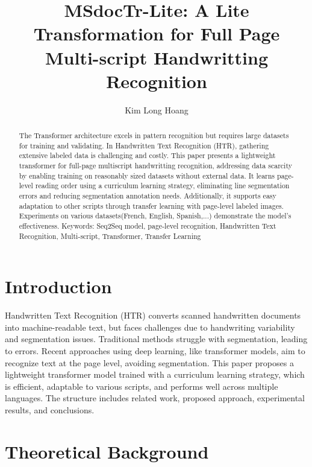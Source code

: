 \documentclass{article}
\title{MSdocTr-Lite: A Lite Transformation for Full Page Multi-script Handwritting Recognition}
\author{Kim Long Hoang}
\begin{document}
\maketitle

\begin{abstract}
 The Transformer architecture excels in pattern recognition but requires large datasets for training and validating. In Handwritten Text Recognition (HTR), gathering extensive labeled data is challenging and costly. This paper presents a lightweight transformer for full-page multiscript handwritting recognition, addressing data scarcity by enabling training on reasonably sized datasets without external data. It learns page-level reading order using a curriculum learning strategy, eliminating line segmentation errors and reducing segmentation annotation needs. Additionally, it supports easy adaptation to other scripts through transfer learning with page-level labeled images. Experiments on various datasets(French, English, Spanish,...) demonstrate the model's effectiveness. 
Keywords: Seq2Seq model, page-level recognition, Handwritten Text Recognition, Multi-script, Transformer, Transfer Learning  
\end{abstract}

\newpage
\tableofcontents
\listoffigures
\listoftables

\newpage
\section{Introduction}

Handwritten Text Recognition (HTR) converts scanned handwritten documents into machine-readable text, but faces challenges due to handwriting variability and segmentation issues. Traditional methods struggle with segmentation, leading to errors. Recent approaches using deep learning, like transformer models, aim to recognize text at the page level, avoiding segmentation. This paper proposes a lightweight transformer model trained with a curriculum learning strategy, which is efficient, adaptable to various scripts, and performs well across multiple languages. The structure includes related work, proposed approach, experimental results, and conclusions.

\section{Theoretical Background}
\end{document}
